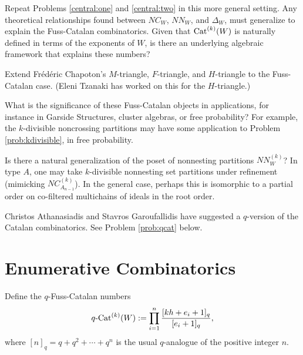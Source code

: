 \documentclass[12pt,letterpaper, reqno]{amsart}
\newcommand{\Cat}{{\rm Cat}}
\begin{document}
\begin{problemblock}
\begin{problem}
Repeat Problems \ref{central:one} and \ref{central:two} in this more general setting. Any theoretical relationships found between $NC_W$, $NN_W$, and $\Delta_W$, must generalize to explain the Fuss-Catalan combinatorics. Given that $\Cat^{(k)}(W)$ is naturally defined in terms of the exponents of $W$, is there an underlying algebraic framework that explains these numbers?
\end{problem}

\begin{remark}
Extend Fr\'ed\'eric Chapoton's $M$-triangle, $F$-triangle, and $H$-triangle to the Fuss-Catalan case. (Eleni Tzanaki has worked on this for the $H$-triangle.)
\end{remark}

\begin{remark}
What is the significance of these Fuss-Catalan objects in applications, for instance in Garside Structures, cluster algebras, or free probability? For example, the $k$-divisible noncrossing partitions may have some application to Problem \ref{prob:kdivisible}, in free probability.
\end{remark}

\begin{remark}
Is there a natural generalization of the poset of nonnesting partitions $NN^{(k)}_W$? In type $A$, one may take $k$-divisible nonnesting set partitions under refinement (mimicking $NC_{A_{n-1}}^{(k)}$). In the general case, perhaps this is isomorphic to a partial order on co-filtered multichains of ideals in the root order.
\end{remark}

\begin{remark}
Christos Athanasiadis and Stavros Garoufallidis have suggested a $q$-version of the Catalan combinatorics. See Problem \ref{prob:qcat} below.
\end{remark}

\end{problemblock}

\section{Enumerative Combinatorics}

Define the {\sf $q$-Fuss-Catalan numbers}
\begin{equation}\label{eq:qcat}
q\text{-\Cat}^{(k)}(W):= \prod_{i=1}^n \frac{[kh+e_i+1]_q}{[e_i+1]_q},
\end{equation}
where $[n]_q=q+q^2+\cdots + q^n$ is the usual $q$-analogue of the positive integer $n$.
\end{document}
